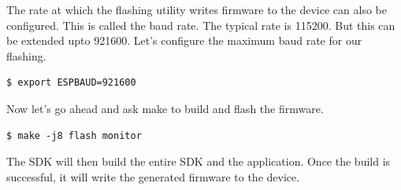 \documentclass[main.tex]{subfiles}
\begin{document}
The rate at which the flashing utility writes firmware to the device can also be configured. This is called the baud rate. The typical rate is 115200. But this can be extended upto 921600. Let's configure the maximum baud rate for our flashing.
\begin{verbatim}
$ export ESPBAUD=921600
\end{verbatim}

Now let's go ahead and ask make to build and flash the firmware.
\begin{verbatim}
$ make -j8 flash monitor
\end{verbatim}

The SDK will then build the entire SDK and the application. Once the build is successful, it will write the generated firmware to the device.

\end{document}

